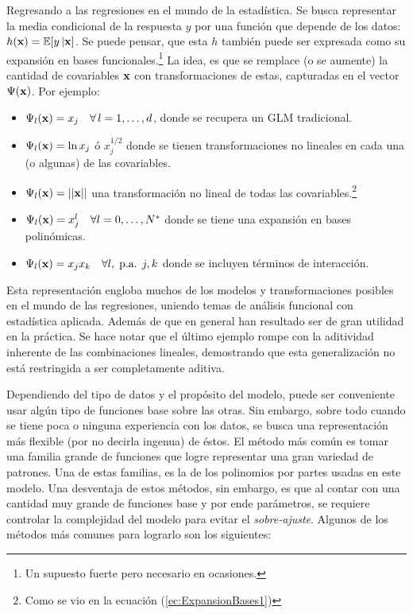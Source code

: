 \documentclass[../Main/Main.tex]{subfiles}
\begin{document}
Regresando a las regresiones en el mundo de la estadística. Se busca representar la media condicional de la respuesta $y$ por una función que depende de los datos: $h(\mathbf{x}) = \mathbb{E}[y\,|\mathbf{x}]$. Se puede pensar, que esta $h$ también puede ser expresada como su expansión en bases funcionales.\footnote{Un supuesto fuerte pero necesario en ocasiones.} La idea, es que se remplace (o se aumente) la cantidad de covariables $\mathbf{x}$ con transformaciones de estas, capturadas en el vector $\Psi(\mathbf{x})$. Por ejemplo:

\begin{itemize}[label = {}]
	\item $\Psi_l(\mathbf{x}) = x_j \quad \forall\,l = 1,\ldots,d$, donde se recupera un GLM tradicional.
	\item $\Psi_l(\mathbf{x}) = \ln x_j$ ó $x_j^{1/2}$ donde se tienen transformaciones no lineales en cada una (o algunas) de las covariables.
	\item $\Psi_l(\mathbf{x}) = ||\mathbf{x}||$ una transformación no lineal de todas las covariables.\footnote{Como se vio en la ecuación (\ref{ec:ExpansionBases1})} 
	\item $\Psi_l(\mathbf{x}) = x_j^l \quad \forall l =0,\ldots,N^*$ donde se tiene una expansión en bases polinómicas.
	\item $\Psi_l(\mathbf{x}) = x_jx_k  \quad \forall l,\;\text{p.a. }j,k$ donde se incluyen términos de interacción. 
\end{itemize}

Esta representación engloba muchos de los modelos y transformaciones posibles en el mundo de las regresiones, uniendo temas de análisis funcional con estadística aplicada. Además de que en general han resultado ser de gran utilidad en la práctica. Se hace notar que el último ejemplo rompe con la aditividad inherente de las combinaciones lineales, demostrando que esta generalización no está restringida a ser completamente aditiva.

Dependiendo del tipo de datos y el propósito del modelo, puede ser conveniente usar algún tipo  de funciones base sobre las otras. Sin embargo, sobre todo cuando se tiene poca o ninguna experiencia con los datos, se busca una representación más flexible (por no decirla ingenua) de éstos. El método más común es tomar una familia grande de funciones que logre representar una gran variedad de patrones. Una de estas familias, es la de los polinomios por partes usadas en este modelo. Una desventaja de estos métodos, sin embargo, es que al contar con una cantidad muy grande de funciones base y por ende parámetros, se requiere controlar la complejidad del modelo para evitar el \textit{sobre-ajuste}. Algunos de los métodos más comunes para lograrlo son los siguientes:
\end{document}

